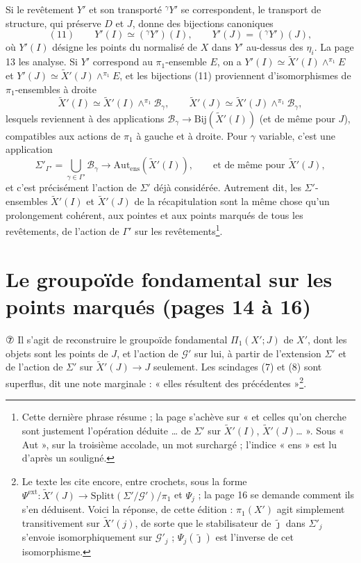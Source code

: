 \documentclass[11pt,a4paper]{article}
\begin{document}
Si le revêtement $Y'$ et son transporté ${}^{\gamma}Y'$ se correspondent,
le transport de structure, qui préserve $D$ et $J$, donne des bijections
canoniques
\[
(11)\qquad Y'(I) \simeq ({}^{\gamma}Y')(I), \qquad Y'(J) = ({}^{\gamma}Y')(J),
\]
où $Y'(I)$ désigne les points du normalisé de $X$ dans $Y'$ au-dessus des
$\eta_i$. La page 13 les analyse. Si $Y'$ correspond au $\pi_1$-ensemble $E$,
on a $Y'(I) \simeq \widetilde X'(I) \wedge^{\pi_1} E$ et $Y'(J) \simeq
\widetilde X'(J) \wedge^{\pi_1} E$, et les bijections (11) proviennent
d'isomorphismes de $\pi_1$-ensembles à droite
\[
\widetilde X'(I) \simeq \widetilde X'(I) \wedge^{\pi_1} \mathcal{B}_\gamma,
\qquad \widetilde X'(J) \simeq \widetilde X'(J) \wedge^{\pi_1}
\mathcal{B}_\gamma,
\]
lesquels reviennent à des applications $\mathcal{B}_\gamma \to
\mathrm{Bij}(\widetilde X'(I))$ (et de même pour $J$), compatibles aux actions
de $\pi_1$ à gauche et à droite. Pour $\gamma$ variable, c'est une application
\[
\Sigma'_{\Gamma'} = \bigcup_{\gamma \in \Gamma'} \mathcal{B}_\gamma
\longrightarrow \mathrm{Aut}_{\mathrm{ens}}(\widetilde X'(I)), \qquad
\text{et de même pour } \widetilde X'(J),
\]
et c'est précisément l'action de $\Sigma'$ déjà considérée. Autrement dit,
les $\Sigma'$-ensembles $\widetilde X'(I)$ et $\widetilde X'(J)$ de la
récapitulation sont la même chose qu'un prolongement cohérent, aux pointes
et aux points marqués de tous les revêtements, de l'action de $\Gamma'$ sur
les revêtements\footnote{Cette dernière phrase résume ; la page s'achève sur
« et celles qu'on cherche sont justement l'opération déduite … de $\Sigma'$ sur
$\widetilde X'(I)$, $\widetilde X'(J)$… ». Sous « Aut », sur la troisième
accolade, un mot surchargé ; l'indice « ens » est lu d'après un souligné.}.

\section*{Le groupoïde fondamental sur les points marqués (pages 14 à 16)}

⑦ Il s'agit de reconstruire le groupoïde fondamental $\Pi_1(X'; J)$ de $X'$,
dont les objets sont les points de $J$, et l'action de $\mathcal{G}'$ sur lui,
à partir de l'extension $\Sigma'$ et de l'action de $\Sigma'$ sur $\widetilde
X'(J) \to J$ seulement. Les scindages (7) et (8) sont superflus, dit une note
marginale : « elles résultent des précédentes »\footnote{Le texte les cite
encore, entre crochets, sous la forme $\Psi^{\mathrm{ext}} : \widetilde X'(J)
\to \mathrm{Splitt}(\Sigma'/\mathcal{G}')/\pi_1$ et $\Psi_j$ ; la page 16 se
demande comment ils s'en déduisent. Voici la réponse, de cette édition :
$\pi_1(X')$ agit simplement transitivement sur $\widetilde X'(j)$, de sorte que
le stabilisateur de $\tilde\jmath$ dans $\Sigma'_j$ s'envoie isomorphiquement
sur $\mathcal{G}'_j$ ; $\Psi_j(\tilde\jmath)$ est l'inverse de cet
isomorphisme.}.
\end{document}
